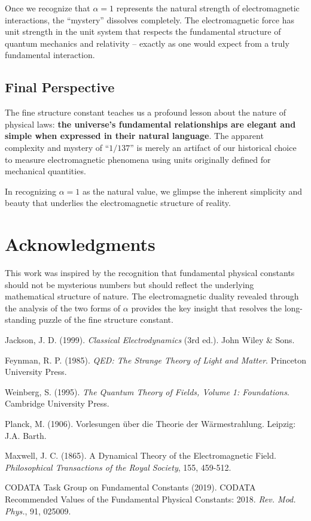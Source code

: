 \documentclass[12pt,a4paper]{article}
\begin{document}
Once we recognize that $\alpha = 1$ represents the natural strength of electromagnetic interactions, the ``mystery'' dissolves completely. The electromagnetic force has unit strength in the unit system that respects the fundamental structure of quantum mechanics and relativity -- exactly as one would expect from a truly fundamental interaction.

\subsection{Final Perspective}

The fine structure constant teaches us a profound lesson about the nature of physical laws: \textbf{the universe's fundamental relationships are elegant and simple when expressed in their natural language}. The apparent complexity and mystery of ``$1/137$'' is merely an artifact of our historical choice to measure electromagnetic phenomena using units originally defined for mechanical quantities.

In recognizing $\alpha = 1$ as the natural value, we glimpse the inherent simplicity and beauty that underlies the electromagnetic structure of reality.
	
	\section{Acknowledgments}
	
	This work was inspired by the recognition that fundamental physical constants should not be mysterious numbers but should reflect the underlying mathematical structure of nature. The electromagnetic duality revealed through the analysis of the two forms of $\alpha$ provides the key insight that resolves the long-standing puzzle of the fine structure constant.
	
	\begin{thebibliography}{9}
		 Jackson, J. D. (1999). \textit{Classical Electrodynamics} (3rd ed.). John Wiley \& Sons.
		
		 Feynman, R. P. (1985). \textit{QED: The Strange Theory of Light and Matter}. Princeton University Press.
		
		 Weinberg, S. (1995). \textit{The Quantum Theory of Fields, Volume 1: Foundations}. Cambridge University Press.
		
		 Planck, M. (1906). Vorlesungen über die Theorie der Wärmestrahlung. Leipzig: J.A. Barth.
		
		 Maxwell, J. C. (1865). A Dynamical Theory of the Electromagnetic Field. \textit{Philosophical Transactions of the Royal Society}, 155, 459-512.
		
		 CODATA Task Group on Fundamental Constants (2019). CODATA Recommended Values of the Fundamental Physical Constants: 2018. \textit{Rev. Mod. Phys.}, 91, 025009.
	\end{thebibliography}
	
\end{document}

